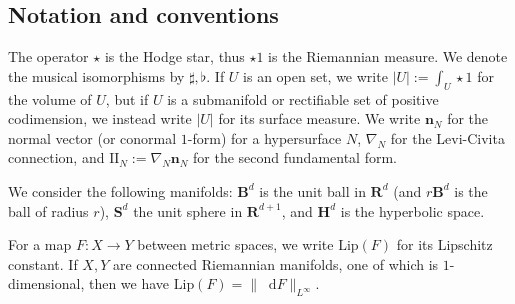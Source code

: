 \documentclass[reqno,11pt]{amsart}
\newcommand{\RR}{\mathbf{R}}
\newcommand{\Hyp}{\mathbf H}
\newcommand{\Sph}{\mathbf S}
\newcommand{\Ball}{\mathbf{B}}
\newcommand*\dif{\mathop{}\!\mathrm{d}}
\newcommand{\Two}{\mathrm{I\!I}}
\newcommand{\normal}{\mathbf n}
\newcommand{\Lip}{\mathrm{Lip}}
\theoremstyle{definition}
\numberwithin{equation}{section}
\begin{document}

\subsection{Notation and conventions}
The operator $\star$ is the Hodge star, thus $\star 1$ is the Riemannian measure.
We denote the musical isomorphisms by $\sharp, \flat$.
If $U$ is an open set, we write $|U| := \int_U \star 1$ for the volume of $U$, but if $U$ is a submanifold or rectifiable set of positive codimension, we instead write $|U|$ for its surface measure.
We write $\normal_N$ for the normal vector (or conormal $1$-form) for a hypersurface $N$, $\nabla_N$ for the Levi-Civita connection, and $\Two_N := \nabla_N \normal_N$ for the second fundamental form.

We consider the following manifolds: $\Ball^d$ is the unit ball in $\RR^d$ (and $r\Ball^d$ is the ball of radius $r$), $\Sph^d$ the unit sphere in $\RR^{d + 1}$, and $\Hyp^d$ is the hyperbolic space.

For a map $F: X \to Y$ between metric spaces, we write $\Lip(F)$ for its Lipschitz constant.
If $X, Y$ are connected Riemannian manifolds, one of which is $1$-dimensional, then we have $\Lip(F) = \|\dif F\|_{L^\infty}$.

\end{document}
